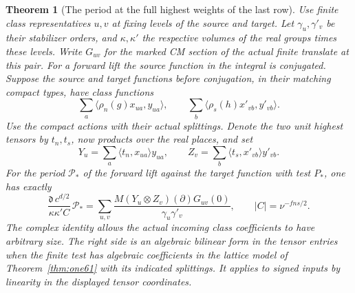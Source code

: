 \documentclass[a4paper,11pt]{article}
\newtheorem{theorem}[proposition]{Theorem}
\theoremstyle{definition}
\theoremstyle{remark}
\numberwithin{equation}{section}
\begin{document}
\begin{theorem}[The period at the full highest weights of the last row]
\label{thm:last244}
Use finite class representatives \(u,v\) at fixing levels of the
source and target. Let \(\gamma_u,\gamma'_v\) be their stabilizer
orders, and \(\kappa,\kappa'\) the respective volumes of the
real groups times these levels. Write \(G_{uv}\) for the marked
CM section of the actual finite translate at this pair. For a
forward lift the source function in the integral is conjugated.
Suppose the source and target functions before conjugation, in
their matching compact types, have class functions
\[
 \sum_a\langle\rho_n(g)x_{ua},y_{ua}\rangle,\qquad
 \sum_b\langle\rho_s(h)x'_{vb},y'_{vb}\rangle .
\]
Use the compact actions with their actual splittings. Denote the
two unit highest tensors by \(t_n,t_s\), now products over the
real places, and set
\[
   Y_u=\sum_a\langle t_n,x_{ua}\rangle y_{ua},\qquad
   Z_v=\sum_b\langle t_s,x'_{vb}\rangle y'_{vb}.
\]
For the period \(\mathcal P_*\) of the forward lift against the
target function with test \(P_*\), one has exactly
\[
 \frac{\mathfrak d\,c^{d/2}}{\kappa\kappa' C}\,\mathcal P_*
   =\sum_{u,v}\frac{
         M(Y_u\otimes Z_v)(\partial)G_{uv}(0)}{\gamma_u\gamma'_v},
           \qquad |C|=\nu^{-fns/2}.
\]
The complex identity allows the actual incoming class coefficients
to have arbitrary size. The right side is an algebraic bilinear
form in the tensor entries when the finite test has algebraic
coefficients in the lattice model of Theorem~\ref{thm:one61} with
its indicated splittings. It applies to signed inputs by linearity
in the displayed tensor coordinates.
\end{theorem}
\end{document}
